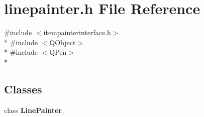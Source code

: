 \section{linepainter.\+h File Reference}
\label{curve_2painters_2linepainter_8h}
{\ttfamily \#include $<$itempainterinterface.\+h$>$}\\*
{\ttfamily \#include $<$Q\+Object$>$}\\*
{\ttfamily \#include $<$Q\+Pen$>$}\\*
\subsection*{Classes}
\begin{DoxyCompactItemize}
\item 
class {\bf Line\+Painter}
\end{DoxyCompactItemize}
